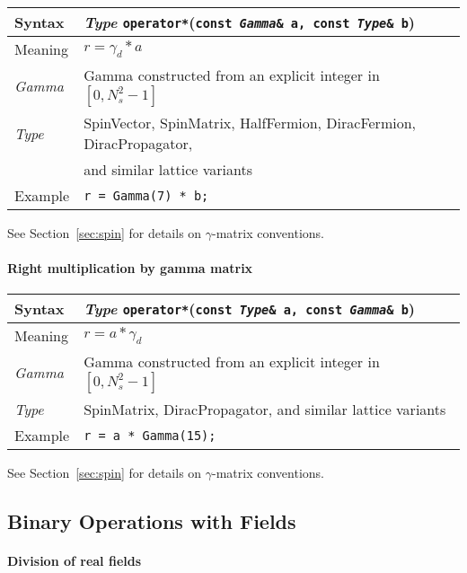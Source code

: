\documentclass[12pt,letterpaper]{article}
\newcommand{\tHalfFermion}{HalfFermion}
\newcommand{\tDiracFermion}{DiracFermion}
\newcommand{\tDiracPropagator}{DiracPropagator}
\newcommand{\tSpinMatrix}{SpinMatrix}
\newcommand{\tSpinVector}{SpinVector}
\newcommand{\itt}{\it Type}
\begin{document}
\begin{flushleft}
  \begin{tabular}{|l|l|}
  \hline
  Syntax      & {\it Type} \verb|operator*|({\tt const {\it Gamma}\& a, const {\it Type}\& b})\\
  \hline
  Meaning     & $r = \gamma_d * a$ \\
  \hline
  {\it Gamma} & Gamma constructed from an explicit integer in $[0,N_s^2-1]$\\
  \itt        & \tSpinVector, \tSpinMatrix, \tHalfFermion, \tDiracFermion, \tDiracPropagator, \\
              & and similar lattice variants \\
  \hline
  Example     & \verb|r = Gamma(7) * b;|\\
  \hline
  \end{tabular}
\end{flushleft}

See Section~\ref{sec:spin} for details on $\gamma$-matrix conventions.


\paragraph{Right multiplication by gamma matrix}
\begin{flushleft}
  \begin{tabular}{|l|l|}
  \hline
  Syntax      & {\it Type} \verb|operator*|({\tt const {\it Type}\& a, const {\it Gamma}\& b})\\
  \hline
  Meaning     & $r = a * \gamma_d$ \\
  \hline
  {\it Gamma} & Gamma constructed from an explicit integer in $[0,N_s^2-1]$\\
  \itt        & \tSpinMatrix, \tDiracPropagator, and similar lattice variants \\
  \hline
  Example     & \verb|r = a * Gamma(15);|\\
  \hline
  \end{tabular}
\end{flushleft}

See Section~\ref{sec:spin} for details on $\gamma$-matrix conventions.

\subsection{Binary Operations with Fields}

\paragraph{Division of real fields}
\end{document}
